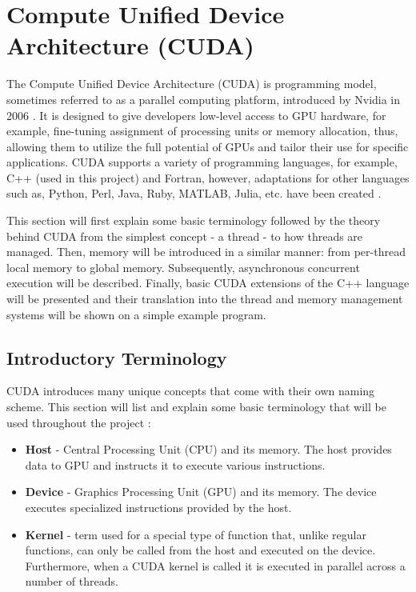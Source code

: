 \section{Compute Unified Device Architecture (CUDA)}\label{Section:CUDA}
The Compute Unified Device Architecture (CUDA) is programming model, sometimes referred to as a parallel computing platform, introduced by Nvidia in 2006 \cite{Oh10September2012}. It is designed to give developers low-level access to GPU hardware, for example, fine-tuning assignment of processing units or memory allocation, thus, allowing them to utilize the full potential of GPUs and tailor their use for specific applications. CUDA supports a variety of programming languages, for example, C++ (used in this project) and Fortran, however, adaptations for other languages such as, Python, Perl, Java, Ruby, MATLAB, Julia, etc. have been created \cite{OsGyRFLMngy0j8Pv}.
\par This section will first explain some basic terminology followed by the theory behind CUDA from the simplest concept - a thread - to how threads are managed. Then, memory will be introduced in a similar manner: from per-thread local memory to global memory. Subsequently, asynchronous concurrent execution will be described. Finally, basic CUDA extensions of the C++ language will be presented and their translation into the thread and memory management systems will be shown on a simple example program.

\subsection{Introductory Terminology}\label{Subsection:CUDA-introductory-terminology}
CUDA introduces many unique concepts that come with their own naming scheme. This section will list and explain some basic terminology that will be used throughout the project \cite{Ruetsch2008}:
\begin{itemize}
	\item \textbf{Host} - Central Processing Unit (CPU) and its memory. The host provides data to GPU and instructs it to execute various instructions.
	\item \textbf{Device} - Graphics Processing Unit (GPU) and its memory. The device executes specialized instructions provided by the host.
	\item \textbf{Kernel} - term used for a special type of function that, unlike regular functions, can only be called from the host and executed on the device. Furthermore, when a CUDA kernel is called it is executed in parallel across a number of threads.	
\end{itemize}

